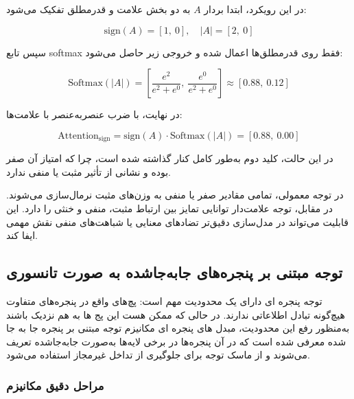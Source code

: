 در این رویکرد، ابتدا بردار $A$ به دو بخش علامت و قدرمطلق تفکیک می‌شود:

\[
\text{sign}(A) = [1,\ 0], \quad
|A| = [2,\ 0]
\]

سپس تابع softmax فقط روی قدرمطلق‌ها اعمال شده و خروجی زیر حاصل می‌شود:

\[
\text{Softmax}(|A|) = 
\left[
\frac{e^2}{e^2 + e^0},\ 
\frac{e^0}{e^2 + e^0}
\right]
\approx [0.88,\ 0.12]
\]

در نهایت، با ضرب عنصر‌به‌عنصر با علامت‌ها:

\[
\text{Attention}_{\text{sign}} = 
\text{sign}(A) \cdot \text{Softmax}(|A|) = [0.88,\ 0.00]
\]

در این حالت، کلید دوم به‌طور کامل کنار گذاشته شده است، چرا که امتیاز آن صفر بوده و نشانی از تأثیر مثبت یا منفی ندارد.


در توجه معمولی، تمامی مقادیر صفر یا منفی به وزن‌های مثبت نرمال‌سازی می‌شوند. در مقابل، توجه علامت‌دار توانایی تمایز بین ارتباط مثبت، منفی و خنثی را دارد. این قابلیت می‌تواند در مدل‌سازی دقیق‌تر تضادهای معنایی یا شباهت‌های منفی نقش مهمی ایفا کند.


\subsection{توجه مبتنی بر پنجره‌های جابه‌جا‌شده به صورت تانسوری}



توجه پنجره ای دارای یک محدودیت مهم است: پچ‌های واقع در پنجره‌های متفاوت هیچ‌گونه تبادل اطلاعاتی ندارند.
در حالی که ممکن هست این پج ها به هم نزدیک باشند به‌منظور رفع این محدودیت، مبدل های پنجره ای مکانیزم توجه مبتنی بر پنجره جا به جا شده معرفی شده است که در آن پنجره‌ها در برخی لایه‌ها به‌صورت جابه‌جا‌شده تعریف می‌شوند و از ماسک توجه برای جلوگیری از تداخل غیرمجاز استفاده می‌شود.

\subsubsection*{مراحل دقیق مکانیزم }

